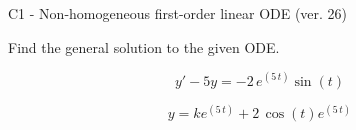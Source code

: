 \begin{exercise}
  \begin{exerciseTitle}C1 - Non-homogeneous first-order linear ODE (ver. 26)\end{exerciseTitle}
  \begin{exerciseStatement}
    
Find the general solution to the given ODE.

    
\[y'-5y= -2 \, e^{\left(5 \, t\right)} \sin\left(t\right)\]

  \end{exerciseStatement}
  \begin{exerciseAnswer}
    
\[y= k e^{\left(5 \, t\right)} + 2 \, \cos\left(t\right) e^{\left(5 \, t\right)}\]

  \end{exerciseAnswer}
\end{exercise}